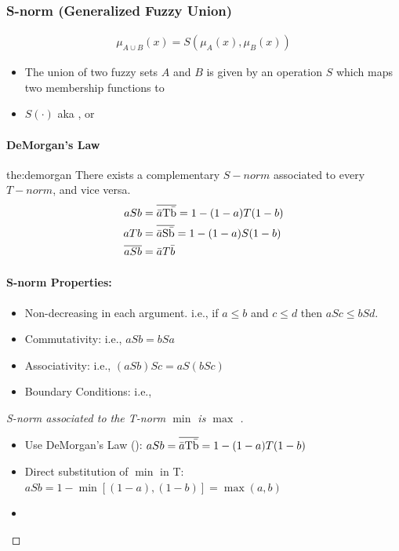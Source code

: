 \documentclass{tron}
\begin{document}
\subsubsection{S-norm (Generalized Fuzzy Union)}
\begin{align}
	\mu_{A\cup B} (x) = S (\mu_A(x), \mu_B(x)) \label{eqn:fuzzy:s-norm}
\end{align}
\begin{itemize}
	\item The union of two fuzzy sets $A$ and $B$ is given by an operation $S$ which maps two membership functions to 
	\item $S(\cdot)$ aka , or 
\end{itemize}

\paragraph{DeMorgan's Law}
\begin{theorem}{the:demorgan}
	There exists a complementary $S-norm$ associated to every $T-norm$, and vice versa.
	\begin{align}
		aSb & = \overline{\bar{a} \rm{T} \bar{b}} = 1 - (1-a)T(1-b) \\
		aTb & = \overline{\bar{a} \rm{S} \bar{b}} = 1 - (1-a)S(1-b) \\
		\overline{aSb} &= \bar a T \bar b
	\end{align}
\end{theorem}
\paragraph{S-norm Properties:}
\begin{itemize}
	\item Non-decreasing in each argument. i.e., if $a\leq b$ and $c \leq d$ then $aSc \leq bSd$.
	\item Commutativity: i.e., $aSb = bSa$
	\item Associativity: i.e., $(aSb)Sc = aS(bSc)$
	\item Boundary Conditions: i.e., 
\end{itemize}
\begin{proof}[S-norm associated to the T-norm $\min$ is $\max$ ]{}
\begin{itemize}
	\item Use DeMorgan's Law (): $aSb = \overline{\bar{a} \rm{T} \bar{b}} = 1 - (1-a)T(1-b)$
	\item Direct substitution of $\min$ in T: $aSb = 1 - \min[(1-a), (1-b)] = \max(a,b)$
	\item \QED
\end{itemize}	
\end{proof}
\end{document}
